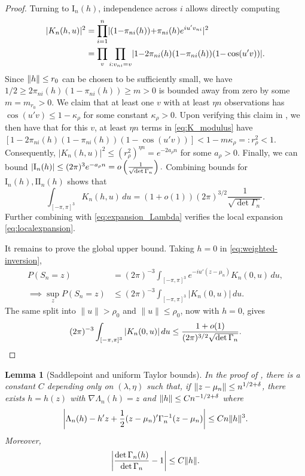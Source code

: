 \documentclass[12pt,reqno]{amsart}
\theoremstyle{theorem}
\newtheorem{lem}{Lemma}[section]
\theoremstyle{definition}
\newcommand{\0}{\mathbf{0}}
\newcommand{\1}{\mathbf{1}}
\begin{document}
\begin{proof}
Turning to \(\mathrm{I}_n(h)\),
independence across $i$ allows
directly computing
\begin{align}
	|K_n(h, u)|^2
	&= \prod_{i=1}^n \abs{(1{-}\pi_{ni}(h)) {+} \pi_{ni}(h) e^{iu'v_{ni}}}^2
	\notag
	\\
	&=
	\prod_v\prod_{i: v_{ni}=v} \abs{1{-}2\pi_{ni}(h) (1{-}\pi_{ni}(h)) (1{-}\cos(u'v))}.
	\label{eq:K_modulus}
\end{align}
Since $\norm{h} \le r_0$ can be chosen to be sufficiently small,
we have $1/2 \ge 2\pi_
{ni} (h)
(1-\pi_{ni}(h)) \ge m > 0$ is bounded away from zero by some $ m = m_{r_0} > 0$. We claim
that at least one $v$ with at least $\eta n$ observations has $\cos(u'v) \le
1-\kappa_\rho$ for some constant $\kappa_\rho > 0$.
Upon verifying this claim in
, we then have that
for this $v$, at least $\eta n$ terms in \eqref{eq:K_modulus} have \(
	[1-2\pi_{ni}(h) (1-\pi_{ni}(h)) (1-\cos(u'v))] < 1-m\kappa_\rho =: r_\rho^2 < 1.
\)
Consequently, \(
	|K_n(h, u)|^2 \le (r_\rho^2)^{\eta n} = e^{-2a_\rho n}
\)
for some $a_\rho > 0$. Finally, we can bound \(
	|\mathrm{I}_n(h)| \le (2\pi)^3 e^{-a_\rho n} = o\pr{
	\frac{1}{\sqrt{\det \Gamma_n}}}.
\)
Combining bounds for $\mathrm{I}_n(h), \mathrm{II}_n(h)$ shows that \[
	\int_{[-\pi, \pi]^3} K_n(h, u) \,du = (1+o(1)) (2\pi)^{3/2} \frac{1}{\sqrt{\det
	\Gamma_n}}.
\]
Further combining with \eqref{eq:expansion_Lambda} verifies the local expansion
\eqref{eq:localexpansion}.

\medskip
It remains to prove the global upper bound.  Taking \(h=0\) in
\eqref{eq:weighted-inversion},
\begin{align*}
P(S_n=z)
&=
(2\pi)^{-3}\int_{[-\pi,\pi]^3}
e^{-iu'(z-\mu_n)}K_n(0,u)\,du,
\\
\implies
\sup_zP(S_n=z)
&\le
(2\pi)^{-3}\int_{[-\pi,\pi]^3}|K_n(0,u)|\,du.
\end{align*}
The same split into \(\|u\|>\rho_0\) and \(\|u\|\le\rho_0\), now with \(h=0\),
gives
\[
	(2\pi)^{-3}\int_{[-\pi,\pi]^3}|K_n(0,u)|\,du
	\le
	\frac{1+o(1)}{(2\pi)^{3/2}\sqrt{\det\Gamma_n}}.
    \qedhere
\]
\end{proof}

\begin{lem}[Saddlepoint and uniform Taylor bounds]\label{lem:saddlepoint}
In the proof of , there is a constant $C$ depending only on $(\lambda,\eta)$ such that, if $\norm{z-\mu_n} \le n^{1/2+\delta}$, there exists
$h = h(z)$ with $\nabla \Lambda_n (h) = z$
and $\norm{h} \le C n^{-1/2 + \delta}$ where \[
	\abs[\bigg]{ \Lambda_n(h) - h'z + \frac{1}{2} (z-\mu_n)' \Gamma_n^{-1} (z-\mu_n)} \le
	C n
	\norm{h}^3.
\]
Moreover, \[
	\abs[\bigg]{\frac{\det \Gamma_n(h)}{\det \Gamma_n} - 1} \le C \norm{h}.
\]
\end{lem}
\end{document}
